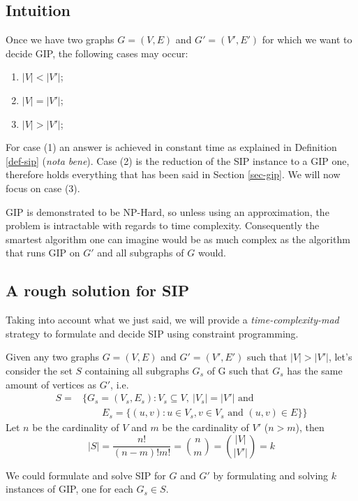 \documentclass[a4paper,12pt]{article}
\theoremstyle{newplanestyle}
\theoremstyle{newdefinitionstyle}
\theoremstyle{newprovestyle}
\begin{document}
\subsection{Intuition}
Once we have two graphs $G=(V,E)$ and $G'=(V',E')$ for which we want to decide GIP, the following cases may occur:
\begin{enumerate}
	\item $|V| < |V'|$;
	\item $|V| = |V'|$;
	\item $|V| > |V'|$;
\end{enumerate}
For case (1) an answer is achieved in constant time as explained in Definition \ref{def-sip} (\textit{nota bene}). Case (2) is the reduction of the SIP instance to a GIP one, therefore holds everything that has been said in Section \ref{sec-gip}. We will now focus on case (3).

GIP is demonstrated to be NP-Hard, so unless using an approximation, the problem is intractable with regards to time complexity. Consequently the smartest algorithm one can imagine would be as much complex as the algorithm that runs GIP on $G'$ and all subgraphs of $G$ would.

\subsection{A rough solution for SIP}
Taking into account what we just said, we will provide a \textit{time-complexity-mad} strategy to formulate and decide SIP using constraint programming.

Given any two graphs $G=(V,E)$ and $G'=(V',E')$ such that $|V| > |V'|$, let's consider the set $S$ containing all subgraphs $G_s$ of G such that $G_s$ has the same amount of vertices as $G'$, i.e. 
\[
\begin{split}
S = & \{G_s=(V_s, E_s) : V_s \subseteq V,\ |V_s| = |V'| \text{ and }\\
& \qquad E_s = \{(u,v) : u \in V_s, v \in V_s \text{ and } (u,v) \in E \}\}
\end{split}
\]
Let $n$ be the cardinality of $V$ and $m$ be the cardinality of $V'$ ($n > m$), then
\begin{equation}\label{sip-complexity}
|S| = \frac{n!}{(n-m)!m!} = \binom{n}{m} = \binom{|V|}{|V'|} = k
\end{equation}

We could formulate and solve SIP for $G$ and $G'$ by formulating and solving $k$ instances of GIP, one for each $G_s \in S$. 
\end{document}
